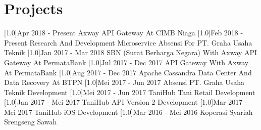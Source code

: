 \documentclass[english]{cv-style}
\begin{document}
\section{Projects}
\vspace{-0.3cm}
\begin{entrylist}
\entry
{\scalebox{.6}[1.0]{Apr 2018 - Present}}
{Axway API Gateway At CIMB Niaga}
{}
{}
\entry
{\scalebox{.6}[1.0]{Feb 2018 - Present}}
{Research And Development Microservice Absensi For PT. Graha Usaha Teknik}
{}
{}
\entry
{\scalebox{.6}[1.0]{Jan 2017 - Mar 2018}}
{SBN (Surat Berharga Negara) With Axway API Gateway At PermataBank}
{}
{}
\entry
{\scalebox{.6}[1.0]{Jul 2017 - Dec 2017}}
{API Gateway With Axway At PermataBank}
{}
{}
\entry
{\scalebox{.6}[1.0]{Aug 2017 - Dec 2017}}
{Apache Cassandra Data Center And Data Recovery At BTPN}
{}
{}
\entry
{\scalebox{.6}[1.0]{Mei 2017 - Jun 2017}}
{Absensi PT. Graha Usaha Teknik Development}
{}
{}
\entry
{\scalebox{.6}[1.0]{Mei 2017 - Jun 2017}}
{TaniHub Tani Retail Development}
{}
{}
\entry
{\scalebox{.6}[1.0]{Jan 2017 - Mei 2017}}
{TaniHub API Version 2 Development}
{}
{}
\entry
{\scalebox{.6}[1.0]{Mar 2017 - Mei 2017}}
{TaniHub iOS Development}
{}
{}
\entry
{\scalebox{.6}[1.0]{Mar 2016 - Mei 2016}}
{Koperasi Syariah Srengseng Sawah}
{}
{}
\end{entrylist}
\end{document}
